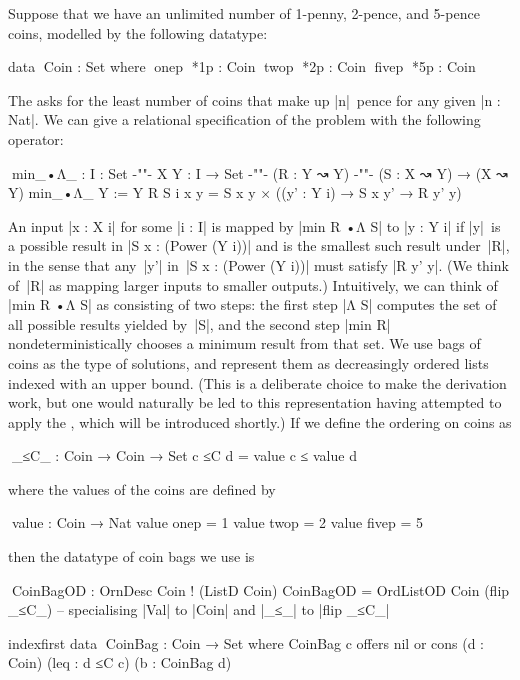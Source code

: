 Suppose that we have an unlimited number of 1-penny, 2-pence, and 5-pence coins, modelled by the following datatype:
\begin{code}
data ^^^Coin : Set where
  ^^^onep ^^^*1p   : Coin
  ^^^twop ^^^*2p  : Coin
  ^^^fivep ^^^*5p : Coin
\end{code}
The  asks for the least number of coins that make up |n|~pence for any given |n : Nat|.
We can give a relational specification of the problem with the following  operator:
\begin{code}
^^^min_•Λ_ : {I : Set} {-"\kern-1pt"-} {X Y : I → Set} {-"\kern-1pt"-} (R : Y ↝ Y) {-"\kern-1pt"-} (S : X ↝ Y) → (X ↝ Y)
min_•Λ_ {Y := Y} R S {i} x y = S x y × ((y' : Y i) → S x y' → R y' y)
\end{code}
An input |x : X i| for some |i : I| is mapped by |min R •Λ S| to |y : Y i| if |y|~is a possible result in |S x : (Power (Y i))| and is the smallest such result under~|R|, in the sense that any~|y'| in~|S x : (Power (Y i))| must satisfy |R y' y|.
(We think of~|R| as mapping larger inputs to smaller outputs.)
Intuitively, we can think of |min R •Λ S| as consisting of two steps: the first step |Λ S| computes the set of all possible results yielded by~|S|, and the second step |min R| nondeterministically chooses a minimum result from that set.
We use bags of coins as the type of solutions, and represent them as decreasingly ordered lists indexed with an upper bound.
(This is a deliberate choice to make the derivation work, but one would naturally be led to this representation having attempted to apply the , which will be introduced shortly.)
If we define the ordering on coins as
\begin{code}
^^^_≤C_ : Coin → Coin → Set
c ≤C d = value c ≤ value d
\end{code}
where the values of the coins are defined by
\begin{code}
^^^value : Coin → Nat
value  onep   =  1
value  twop   =  2
value  fivep  =  5
\end{code}
then the datatype of coin bags we use is
\begin{code}
^^^CoinBagOD : OrnDesc Coin ! (ListD Coin)
CoinBagOD = OrdListOD Coin (flip _≤C_)
-- specialising |Val| to |Coin| and |_≤_| to |flip _≤C_|

indexfirst data ^^^CoinBag : Coin → Set where
  CoinBag c  offers  nil
             or      cons  (d : Coin) (leq : d ≤C c) (b : CoinBag d)
\end{code}
